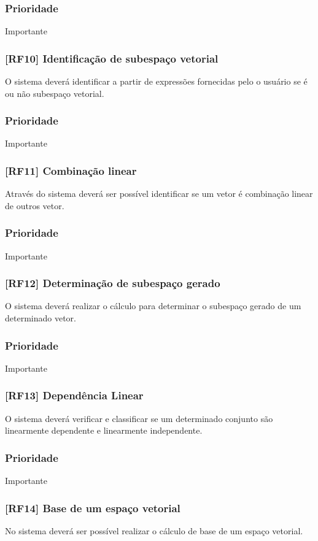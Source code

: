 \documentclass{scrreprt}
\begin{document}
\subsubsection{Prioridade}
Importante

\subsubsection{[RF10] Identificação de subespaço vetorial}
O sistema deverá identificar a partir de expressões fornecidas pelo o usuário se é ou não subespaço vetorial.
\subsubsection{Prioridade}
Importante

\subsubsection{[RF11] Combinação linear}
Através do sistema deverá ser possível identificar se um vetor é combinação linear de outros vetor.
\subsubsection{Prioridade}
Importante

\subsubsection{[RF12] Determinação de subespaço gerado}
O sistema deverá realizar o cálculo para determinar o subespaço gerado de um determinado vetor.
\subsubsection{Prioridade}
Importante

\subsubsection{[RF13] Dependência Linear}
O sistema deverá verificar e classificar se um determinado conjunto são linearmente dependente e linearmente independente.
\subsubsection{Prioridade}
Importante

\subsubsection{[RF14] Base de um espaço vetorial}
No sistema deverá ser possível realizar o cálculo de base de um espaço vetorial.
\end{document}
